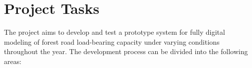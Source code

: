 \section{Project Tasks}\label{sec:requirements:project_tasks}
The project aims to develop and test a prototype system for fully digital modeling of forest road load-bearing capacity under varying conditions throughout the year. The development process can be divided into the following areas:

